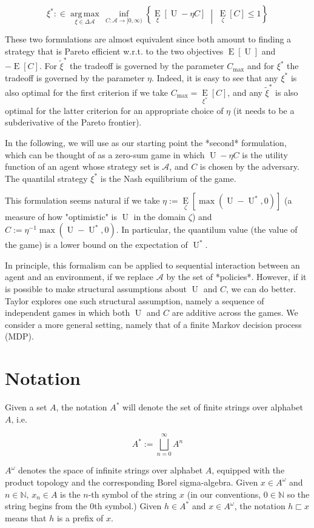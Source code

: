 \documentclass[a4paper]{article}
\newcommand{\AP}[1]{\left(#1\right)}
\newcommand{\AB}[1]{\left[#1\right]}
\newcommand{\ACM}[2]{\left\{#1\;\middle\vert\;#2\right\}}
\newcommand{\Ea}[2]{\underset{#1}{\operatorname{E}}\AB{#2}}
\newcommand{\Argmax}[1]{\underset{#1}{\operatorname{arg\,max}}\,}
\newcommand{\Nats}{\mathbb{N}}
\newcommand{\A}{\mathcal{A}}
\newcommand{\Ut}{\operatorname{U}}
\newcommand{\Co}{C}
\begin{document}
$$\xi^* :\in \Argmax{\xi \in \Delta\A}\inf_{\Co:\A\rightarrow[0,\infty)}\ACM{\Ea{\xi}{\Ut-\eta \Co}}{\Ea{\zeta}{\Co} \leq 1}$$

These two formulations are almost equivalent since both amount to finding a strategy that is Pareto efficient w.r.t. to the two objectives $\Ea{}{\Ut}$ and $-\Ea{}{\Co}$. For $\tilde{\xi}^*$ the tradeoff is governed by the parameter $C_{\max}$ and for $\xi^*$ the tradeoff is governed by the parameter $\eta$. Indeed, it is easy to see that any $\xi^*$ is also optimal for the first criterion if we take $C_{\max}=\Ea{\xi^*}{\Co}$, and any $\tilde{\xi}^*$ is also optimal for the latter criterion for an appropriate choice of $\eta$ (it needs to be a subderivative of the Pareto frontier).

In the following, we will use as our starting point the *second* formulation, which can be thought of as a zero-sum game in which $\Ut-\eta \Co$ is the utility function of an agent whose strategy set is $\A$, and $\Co$ is chosen by the adversary. The quantilal strategy $\xi^*$ is the Nash equilibrium of the game.

This formulation seems natural if we take $\eta:=\Ea{\zeta}{\max\AP{\Ut-\Ut^*,0}}$ (a measure of how "optimistic" is $\Ut$ in the domain $\zeta$) and $\Co:=\eta^{-1}\max\AP{\Ut-\Ut^*,0}$. In particular, the quantilum value (the value of the game) is a lower bound on the expectation of $\Ut^*$.

In principle, this formalism can be applied to sequential interaction between an agent and an environment, if we replace $\A$ by the set of *policies*. However, if it is possible to make structural assumptions about $\Ut$ and $C$, we can do better. Taylor explores one such structural assumption, namely a sequence of independent games in which both $\Ut$ and $\Co$ are additive across the games. We consider a more general setting, namely that of a finite Markov decision process (MDP).

\section{Notation}

Given a set $A$, the notation $A^*$ will denote the set of finite strings over alphabet $A$, i.e.

\[A^* := \bigsqcup_{n = 0}^\infty A^n\]

$A^\omega$ denotes the space of infinite strings over alphabet $A$, equipped with the product topology and the corresponding Borel sigma-algebra. Given $x\in A^\omega$ and $n \in \Nats$, $x_n \in A$ is the $n$-th symbol of the string $x$ (in our conventions, $0 \in \Nats$ so the string begins from the 0th symbol.) Given $h \in A^*$ and $x \in A^\omega$, the notation $h \sqsubset x$ means that $h$ is a prefix of $x$.
\end{document}
